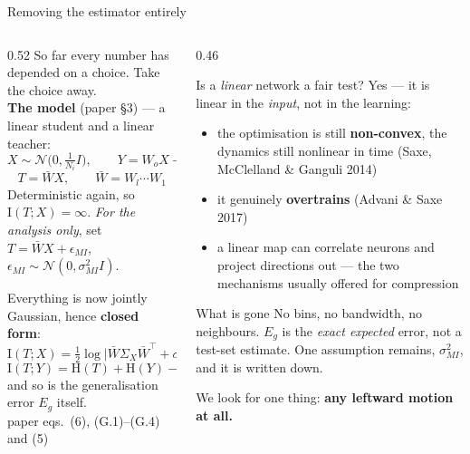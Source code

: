 \documentclass[aspectratio=169,11pt]{beamer}
\newcommand{\I}{\mathrm{I}}
\newcommand{\HH}{\mathrm{H}}
\newcommand{\Norm}{\mathcal{N}}
\newcommand{\Wb}{\bar{W}}
\newcommand{\smi}{\sigma_{MI}}
\begin{document}
\begin{frame}{Removing the estimator entirely}
\begin{columns}[T]
\begin{column}{0.52\textwidth}
\footnotesize
So far every number has depended on a choice. Take the choice away.\\[4pt]
\textbf{The model} (paper \S3) --- a linear student and a linear teacher:
\[ X\sim\Norm\big(0,\tfrac{1}{N_i}I\big),\qquad Y = W_o X + \epsilon_o \]
\[ T = \Wb X, \qquad \Wb = W_l\cdots W_1 \]
Deterministic again, so $\I(T;X)=\infty$. \emph{For the analysis only}, set
$T = \Wb X + \epsilon_{MI}$, \ $\epsilon_{MI}\sim\Norm(0,\smi^2 I)$.
\smallskip

Everything is now jointly Gaussian, hence \textbf{closed form}:
\[ \I(T;X)=\tfrac12\log\big|\Wb\Sigma_X\Wb^\top+\smi^2 I\big|
           -\tfrac12\log\big|\smi^2 I\big| \]
\[ \I(T;Y)=\HH(T)+\HH(Y)-\HH(T,Y) \]
and so is the generalisation error $E_g$ itself.\\
{\scriptsize paper eqs.\ (6), (G.1)--(G.4) and (5)}
\end{column}
\begin{column}{0.46\textwidth}
\begin{block}{\small Is a \emph{linear} network a fair test?}
\footnotesize
Yes --- it is linear in the \emph{input}, not in the learning:
\begin{itemize}\footnotesize
  \item the optimisation is still \textbf{non-convex}, the dynamics still nonlinear in
        time (Saxe, McClelland \& Ganguli 2014)
  \item it genuinely \textbf{overtrains} (Advani \& Saxe 2017)
  \item a linear map can correlate neurons and project directions out --- the two
        mechanisms usually offered for compression
\end{itemize}
\end{block}
\vspace{-3pt}
\begin{alertblock}{\small What is gone}
\footnotesize
No bins, no bandwidth, no neighbours. $E_g$ is the \emph{exact expected} error, not a
test-set estimate. One assumption remains, $\smi^2$, and it is written down.
\end{alertblock}
\vspace{-1pt}
\centering\footnotesize
We look for one thing: \textcolor{bad}{\textbf{any leftward motion at all.}}
\end{column}
\end{columns}
\end{frame}
\end{document}
